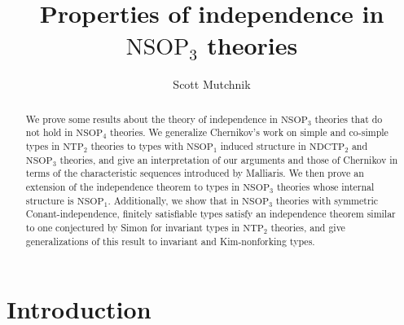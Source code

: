 \documentclass[12pt]{amsart}
\title{Properties of independence in $\mathrm{NSOP}_{3}$ theories}
\author{Scott Mutchnik}
\theoremstyle{definition}
\begin{document}
\begin{abstract}
We prove some results about the theory of independence in $\mathrm{NSOP}_{3}$ theories that do not hold in $\mathrm{NSOP}_{4}$ theories. We generalize Chernikov's work on simple and co-simple types in $\mathrm{NTP}_{2}$ theories to types with $\mathrm{NSOP}_{1}$ induced structure in $\mathrm{NDCTP}_{2}$ and $\mathrm{NSOP}_{3}$ theories, and give an interpretation of our arguments and those of Chernikov in terms of the characteristic sequences introduced by Malliaris. We then prove an extension of the independence theorem to types in $\mathrm{NSOP}_{3}$ theories whose internal structure is $\mathrm{NSOP}_{1}$. Additionally, we show that in $\mathrm{NSOP}_{3}$ theories with symmetric Conant-independence, finitely satisfiable types satisfy an independence theorem similar to one conjectured by Simon for invariant types in $\mathrm{NTP}_{2}$ theories, and give generalizations of this result to invariant and Kim-nonforking types.
\end{abstract}
\maketitle



\section{Introduction}
\end{document}
